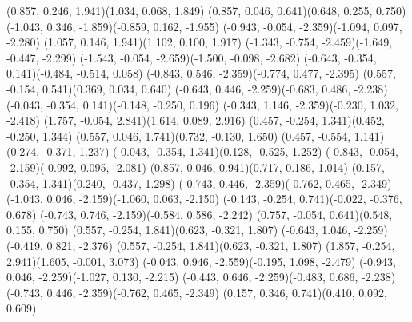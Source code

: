 \pstThreeDLine[linecolor=black](0.857, 0.246, 1.941)(1.034, 0.068, 1.849)
\pstThreeDLine[linecolor=gray](0.857, 0.046, 0.641)(0.648, 0.255, 0.750)
\pstThreeDLine[linecolor=black](-1.043, 0.346, -1.859)(-0.859, 0.162, -1.955)
\pstThreeDLine[linecolor=gray](-0.943, -0.054, -2.359)(-1.094, 0.097, -2.280)
\pstThreeDLine[linecolor=black](1.057, 0.146, 1.941)(1.102, 0.100, 1.917)
\pstThreeDLine[linecolor=gray](-1.343, -0.754, -2.459)(-1.649, -0.447, -2.299)
\pstThreeDLine[linecolor=black](-1.543, -0.054, -2.659)(-1.500, -0.098, -2.682)
\pstThreeDLine[linecolor=black](-0.643, -0.354, 0.141)(-0.484, -0.514, 0.058)
\pstThreeDLine[linecolor=black](-0.843, 0.546, -2.359)(-0.774, 0.477, -2.395)
\pstThreeDLine[linecolor=gray](0.557, -0.154, 0.541)(0.369, 0.034, 0.640)
\pstThreeDLine[linecolor=gray](-0.643, 0.446, -2.259)(-0.683, 0.486, -2.238)
\pstThreeDLine[linecolor=gray](-0.043, -0.354, 0.141)(-0.148, -0.250, 0.196)
\pstThreeDLine[linecolor=black](-0.343, 1.146, -2.359)(-0.230, 1.032, -2.418)
\pstThreeDLine[linecolor=gray](1.757, -0.054, 2.841)(1.614, 0.089, 2.916)
\pstThreeDLine[linecolor=black](0.457, -0.254, 1.341)(0.452, -0.250, 1.344)
\pstThreeDLine[linecolor=black](0.557, 0.046, 1.741)(0.732, -0.130, 1.650)
\pstThreeDLine[linecolor=gray](0.457, -0.554, 1.141)(0.274, -0.371, 1.237)
\pstThreeDLine[linecolor=black](-0.043, -0.354, 1.341)(0.128, -0.525, 1.252)
\pstThreeDLine[linecolor=gray](-0.843, -0.054, -2.159)(-0.992, 0.095, -2.081)
\pstThreeDLine[linecolor=gray](0.857, 0.046, 0.941)(0.717, 0.186, 1.014)
\pstThreeDLine[linecolor=black](0.157, -0.354, 1.341)(0.240, -0.437, 1.298)
\pstThreeDLine[linecolor=gray](-0.743, 0.446, -2.359)(-0.762, 0.465, -2.349)
\pstThreeDLine[linecolor=gray](-1.043, 0.046, -2.159)(-1.060, 0.063, -2.150)
\pstThreeDLine[linecolor=black](-0.143, -0.254, 0.741)(-0.022, -0.376, 0.678)
\pstThreeDLine[linecolor=black](-0.743, 0.746, -2.159)(-0.584, 0.586, -2.242)
\pstThreeDLine[linecolor=gray](0.757, -0.054, 0.641)(0.548, 0.155, 0.750)
\pstThreeDLine[linecolor=black](0.557, -0.254, 1.841)(0.623, -0.321, 1.807)
\pstThreeDLine[linecolor=black](-0.643, 1.046, -2.259)(-0.419, 0.821, -2.376)
\pstThreeDLine[linecolor=black](0.557, -0.254, 1.841)(0.623, -0.321, 1.807)
\pstThreeDLine[linecolor=gray](1.857, -0.254, 2.941)(1.605, -0.001, 3.073)
\pstThreeDLine[linecolor=gray](-0.043, 0.946, -2.559)(-0.195, 1.098, -2.479)
\pstThreeDLine[linecolor=gray](-0.943, 0.046, -2.259)(-1.027, 0.130, -2.215)
\pstThreeDLine[linecolor=gray](-0.443, 0.646, -2.259)(-0.483, 0.686, -2.238)
\pstThreeDLine[linecolor=gray](-0.743, 0.446, -2.359)(-0.762, 0.465, -2.349)
\pstThreeDLine[linecolor=black](0.157, 0.346, 0.741)(0.410, 0.092, 0.609)
